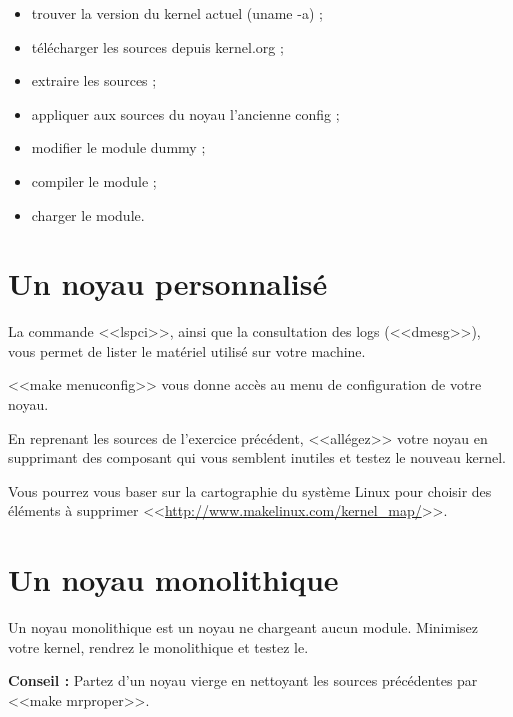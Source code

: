 \documentclass[11pt]{article}
\begin{document}
\begin{itemize}
 \item trouver la version du kernel actuel (uname -a) ;
 \item télécharger les sources depuis kernel.org ;
 \item extraire les sources ;
 \item appliquer aux sources du noyau l'ancienne config ;
 \item modifier le module dummy ;
 \item compiler le module ;
 \item charger le module.
\end{itemize}



\section{Un noyau personnalisé}

La commande <<lspci>>, ainsi que la consultation des logs (<<dmesg>>), vous permet de lister le matériel utilisé sur votre machine.

<<make menuconfig>> vous donne accès au menu de configuration de votre noyau.

En reprenant les sources de l'exercice précédent, <<allégez>> votre noyau en supprimant des composant qui vous semblent inutiles et testez le nouveau kernel.

Vous pourrez vous baser sur la cartographie du système Linux pour choisir des éléments à supprimer <<\url{http://www.makelinux.com/kernel_map/}>>.

\section{Un noyau monolithique}

Un noyau monolithique est un noyau ne chargeant aucun module. Minimisez votre kernel, rendrez le monolithique et testez le.

\textbf{Conseil :} Partez d'un noyau vierge en nettoyant les sources précédentes par <<make mrproper>>.
\end{document}
